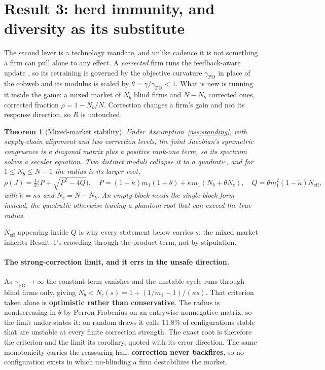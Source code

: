 \documentclass{article}
\theoremstyle{plain}
\newtheorem{theorem}{Theorem}
\theoremstyle{definition}
\newcommand{\Neff}{N_{\mathrm{eff}}}
\begin{document}
\section{Result 3: herd immunity, and diversity as its substitute}
\label{sec:herd}

The second lever is a technology mandate, and unlike cadence it is not something a firm can pull alone to any effect. A \emph{corrected} firm runs the feedback-aware update \citep{izzo2021,miller2021}, so its retraining is governed by the objective curvature $\gamma_{\mathrm{PO}}$ in place of the cobweb and its modulus is scaled by $\theta = \gamma/\gamma_{\mathrm{PO}} < 1$. What is new is running it inside the game: a mixed market of $N_b$ blind firms and $N - N_b$ corrected ones, corrected fraction $\rho = 1 - N_b/N$. Correction changes a firm's gain and not its response direction, so $R$ is untouched.

\begin{theorem}[Mixed-market stability]
\label{thm:mixed}
Under Assumption~\ref{ass:standing}, with supply-chain alignment and two correction levels, the joint Jacobian's symmetric congruence is a diagonal matrix plus a positive rank-one term, so its spectrum solves a secular equation. Two distinct moduli collapse it to a quadratic, and for $1\le N_b \le N-1$ the radius is its larger root,
\begin{equation}
\rho(J) = \tfrac{1}{2}\bigl(P + \sqrt{P^2 - 4Q}\bigr),\quad
P = (1-\tilde{\kappa})m_1(1+\theta) + \tilde{\kappa} m_1(N_b + \theta N_c),\quad
Q = \theta m_1^2 (1-\tilde{\kappa})\Neff,
\end{equation}
with $\tilde{\kappa} = \kappa s$ and $N_c = N - N_b$. An empty block needs the single-block form instead, the quadratic otherwise leaving a phantom root that can exceed the true radius.
\end{theorem}

$\Neff$ appearing inside $Q$ is why every statement below carries $s$: the mixed market inherits Result~1's crowding through the product term, not by stipulation.

\paragraph{The strong-correction limit, and it errs in the unsafe direction.}
As $\gamma_{\mathrm{PO}}\to\infty$ the constant term vanishes and the unstable cycle runs through blind firms only, giving $N_b < N_c(s) = 1 + (1/m_1 - 1)/(\kappa s)$. That criterion taken alone is \textbf{optimistic rather than conservative}. The radius is nondecreasing in $\theta$ by Perron-Frobenius on an entrywise-nonnegative matrix, so the limit under-states it: on random draws it calls $11.8\%$ of configurations stable that are unstable at every finite correction strength. The exact root is therefore the criterion and the limit its corollary, quoted with its error direction. The same monotonicity carries the reassuring half: \textbf{correction never backfires}, so no configuration exists in which un-blinding a firm destabilizes the market.
\end{document}
